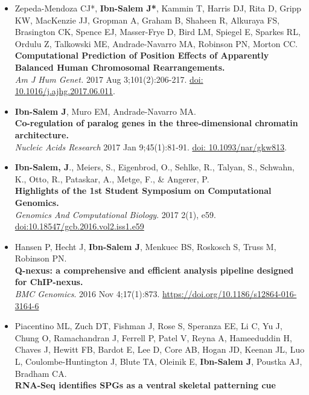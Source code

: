 \documentclass[a4paper,twoside=true,openright,parskip=full,chapterprefix=true,11pt,headings=normal,bibliography=totoc,listof=totoc,titlepage=on,captions=tableabove,draft=false]{scrreprt}
\theoremstyle{definition}
\theoremstyle{definition}
\theoremstyle{definition}
\theoremstyle{remark}
\begin{document}
\begin{itemize}
\item
  Zepeda-Mendoza CJ*, \textbf{Ibn-Salem J*}, Kammin T, Harris DJ, Rita
  D, Gripp KW, MacKenzie JJ, Gropman A, Graham B, Shaheen R, Alkuraya
  FS, Brasington CK, Spence EJ, Masser-Frye D, Bird LM, Spiegel E,
  Sparkes RL, Ordulu Z, Talkowski ME, Andrade-Navarro MA, Robinson PN,
  Morton CC.\\
  \textbf{Computational Prediction of Position Effects of Apparently
  Balanced Human Chromosomal Rearrangements.}\\
  \emph{Am J Hum Genet.} 2017 Aug 3;101(2):206-217.
  \href{https://doi.org/10.1016/j.ajhg.2017.06.011}{doi:
  10.1016/j.ajhg.2017.06.011}.
\item
  \textbf{Ibn-Salem J}, Muro EM, Andrade-Navarro MA.\\
  \textbf{Co-regulation of paralog genes in the three-dimensional
  chromatin architecture.}\\
  \emph{Nucleic Acids Research} 2017 Jan 9;45(1):81-91.
  \href{https://doi.org/10.1093/nar/gkw813}{doi: 10.1093/nar/gkw813}.\\
\item
  \textbf{Ibn-Salem, J}., Meiers, S., Eigenbrod, O., Sehlke, R., Talyan,
  S., Schwahn, K., Otto, R., Pataskar, A., Metge, F., \& Angerer, P.\\
  \textbf{Highlights of the 1st Student Symposium on Computational
  Genomics.}\\
  \emph{Genomics And Computational Biology}. 2017 2(1), e59.
  \href{https://doi.org/10.18547/gcb.2016.vol2.iss1.e59}{doi:10.18547/gcb.2016.vol2.iss1.e59}
\item
  Hansen P, Hecht J, \textbf{Ibn-Salem J}, Menkuec BS, Roskosch S, Truss
  M, Robinson PN.\\
  \textbf{Q-nexus: a comprehensive and efficient analysis pipeline
  designed for ChIP-nexus.}\\
  \emph{BMC Genomics}. 2016 Nov 4;17(1):873.
  \url{https://doi.org/10.1186/s12864-016-3164-6} ~\\
\item
  Piacentino ML, Zuch DT, Fishman J, Rose S, Speranza EE, Li C, Yu J,
  Chung O, Ramachandran J, Ferrell P, Patel V, Reyna A, Hameeduddin H,
  Chaves J, Hewitt FB, Bardot E, Lee D, Core AB, Hogan JD, Keenan JL,
  Luo L, Coulombe-Huntington J, Blute TA, Oleinik E, \textbf{Ibn-Salem
  J}, Poustka AJ, Bradham CA.\\
  \textbf{RNA-Seq identifies SPGs as a ventral skeletal patterning cue
}
\end{itemize}
\end{document}
